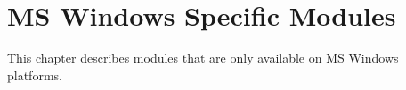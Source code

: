 \chapter{MS Windows Specific Modules}


This chapter describes modules that are only available on MS Windows
platforms.


\localmoduletable

